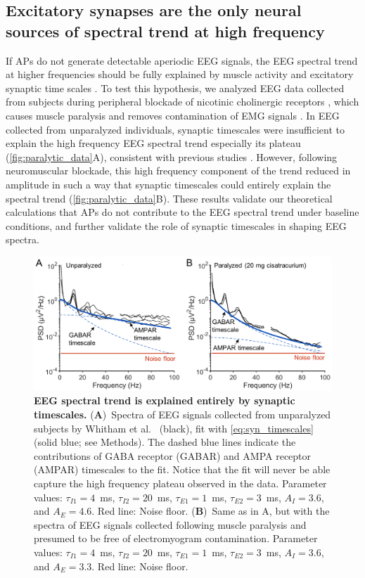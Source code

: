 \subsection{Excitatory synapses are the only neural sources of spectral trend at high frequency}
If APs do not generate detectable aperiodic EEG signals, the EEG spectral trend at higher frequencies should be fully explained by muscle activity \cite{Muthukumaraswamy2013} and excitatory synaptic time scales \cite{Brake2024, Gao2017}. To test this hypothesis, we analyzed EEG data collected from subjects during peripheral blockade of nicotinic cholinergic receptors \cite{Whitham2007}, which causes muscle paralysis and removes contamination of EMG signals \cite{Whitham2007, Fitzgibbon2013}. In EEG collected from unparalyzed individuals, synaptic timescales were insufficient to explain the high frequency EEG spectral trend especially its plateau ({\autoref{fig:paralytic_data}A}), consistent with previous studies \cite{Brake2024}. However, following neuromuscular blockade, this high frequency component of the trend reduced in amplitude in such a way that synaptic timescales could entirely explain the spectral trend ({\autoref{fig:paralytic_data}B}). These results validate our theoretical calculations that APs do not contribute to the EEG spectral trend under baseline conditions, and further validate the role of synaptic timescales in shaping EEG spectra.

\begin{figure}[t!]
    \centering
    \includegraphics[width=13.2cm]{Figures/chapter3/figure5.png}
    \caption{\textbf{EEG spectral trend is explained entirely by synaptic timescales.} (\textbf{A})~Spectra of EEG signals collected from unparalyzed subjects by Whitham et al.~\cite{Whitham2007} (black), fit with {\ref{eq:syn_timescales}} (solid blue; see Methods). The dashed blue lines indicate the contributions of GABA receptor (GABAR) and AMPA receptor (AMPAR) timescales to the fit. Notice that the fit will never be able capture the high frequency plateau observed in the data. Parameter values: $\tau_{I1}=4$~\unit{\milli\second}, $\tau_{I2}=20$~\unit{\milli\second}, $\tau_{E1}=1$~\unit{\milli\second}, $\tau_{E2}=3$~\unit{\milli\second}, $A_I=3.6$, and $A_E=4.6$.  Red line: Noise floor. (\textbf{B})~Same as in A, but with the spectra of EEG signals collected following muscle paralysis and presumed to be free of electromyogram contamination. Parameter values: $\tau_{I1}=4$~\unit{\milli\second}, $\tau_{I2}=20$~\unit{\milli\second}, $\tau_{E1}=1$~\unit{\milli\second}, $\tau_{E2}=3$~\unit{\milli\second}, $A_I=3.6$, and $A_E=3.3$. Red line: Noise floor.}
    \label{fig:paralytic_data}
\end{figure}

